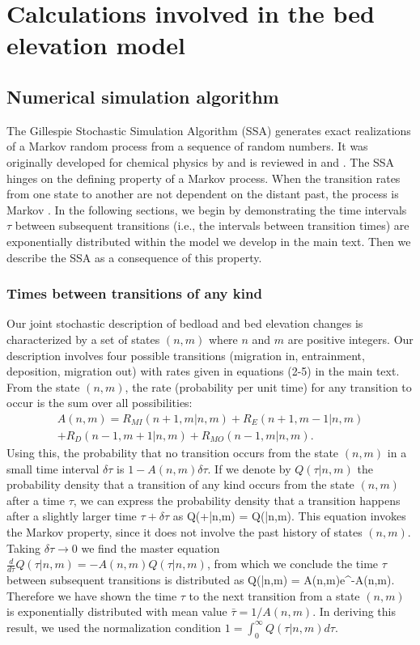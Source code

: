 

\chapter{Calculations involved in the bed elevation model}
\label{ch:gill}
\section{Numerical simulation algorithm}

The Gillespie Stochastic Simulation Algorithm (SSA) generates exact realizations of a Markov random process from a sequence of random numbers.
It was originally developed for chemical physics by \citet{Gillespie1977} and is reviewed in \citet{Gillespie1991} and \citet{Gillespie2007}.
The SSA hinges on the defining property of a Markov process. When the transition rates from one state to another are not dependent on the distant past, the process is Markov \citep[e.g.,][]{Cox1965}.
In the following sections, we begin by demonstrating the time intervals $\tau$ between subsequent transitions (i.e., the intervals between transition times) are exponentially distributed within the model we develop in the main text. Then we describe the SSA as a consequence of this property.

\subsection{Times between transitions of any kind}
Our joint stochastic description of bedload and bed elevation changes is characterized by a set of states $(n,m)$ where $n$ and $m$ are positive integers. 
Our description involves four possible transitions (migration in, entrainment, deposition, migration out) with rates given in equations (2-5) in the main text.
From the state $(n,m)$, the rate (probability per unit time) for any transition to occur is the sum over all possibilities:
\begin{multline} A(n,m) = R_{MI}(n+1,m|n,m) + R_E(n+1,m-1|n,m) \\+ R_D(n-1,m+1|n,m) + R_{MO}(n-1,m|n,m).\end{multline}
Using this, the probability that no transition occurs from the state $(n,m)$ in a small time interval $\delta \tau$ is $1-A(n,m)\delta \tau$. If we denote by $Q(\tau|n,m)$ the probability density that a transition of any kind occurs from the state $(n,m)$ after a time $\tau$, we can express the probability density that a transition happens after a slightly larger time $\tau + \delta \tau$ as 
\be Q(\tau+\delta \tau|n,m) = Q(\tau|n,m).\ee
This equation invokes the Markov property, since it does not involve the past history of states $(n,m)$. Taking $\delta\tau \rightarrow 0 $ we find the master equation $\frac{d}{d\tau}Q(\tau|n,m) = -A(n,m)Q(\tau|n,m)$, from which we conclude the time $\tau$ between subsequent transitions is distributed as 
\be Q(\tau|n,m) = A(n,m)e^{-A(n,m)\tau}. \label{eq:exp}\ee
Therefore we have shown the time $\tau$ to the next transition from a state $(n,m)$ is exponentially distributed with mean value $\bar{\tau} = 1/A(n,m).$ In deriving this result, we used the normalization condition $1 = \int_0^\infty Q(\tau|n,m)d\tau.$


